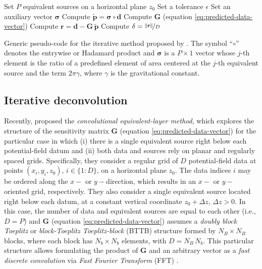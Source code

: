 \begin{algorithm}
	\Input{}
	Set $P$ equivalent sources on a horizontal plane $z_{0}$ \;
	Set a tolerance $\epsilon$ \;
	Set an auxiliary vector $\boldsymbol{\sigma}$ \;
	Compute $\tilde{\mathbf{p}} = \boldsymbol{\sigma} \circ \mathbf{d}$ \;
	Compute $\mathbf{G}$ (equation \ref{eq:predicted-data-vector}) \;
	Compute $\mathbf{r} = \mathbf{d} - \mathbf{G} \, \tilde{\mathbf{p}}$ \;
	Compute $\delta = \nicefrac{\| \mathbf{r} \|}{D}$ \;
	\caption{Generic pseudo-code for the iterative method proposed by \cite{siqueira-etal2017}.
	The symbol ``$\circ$'' denotes the entrywise or Hadamard product \cite[e.g.,][p. 298]{horn-johnson1991} and
	$\boldsymbol{\sigma}$ is a $P \times 1$ vector whose $j$-th element is the ratio of a predefined element of area centered at the $j$-th
	equivalent source and the term $2 \pi \gamma$, where $\gamma$ is the gravitational constant.}
	\label{alg:XS91-SOB17}
\end{algorithm}

\subsection{Iterative deconvolution}

Recently, \citet{takahashi-etal2020,takahashi-etal2022} proposed the \textit{convolutional equivalent-layer method}, 
which explores the structure of the sensitivity matrix $\mathbf{G}$ (equation \ref{eq:predicted-data-vector}) for 
the particular case in which (i) there is a single equivalent source right below each potential-field
datum and (ii) both data and sources rely on planar and regularly spaced grids.
Specifically, they consider a regular grid of $D$ 
potential-field data at points $(x_{i}, y_{i}, z_{0})$, $i \in \{1:D\}$, on a horizontal plane $z_{0}$.
The data indices $i$ may be ordered along the $x-$ or $y-$direction, which results in an
$x-$ or $y-$oriented grid, respectively.
They also consider a single equivalent source located right below each datum, at a constant vertical coordinate
$z_{0} + \Delta z$, $\Delta z > 0$.
In this case, the number of data and equivalent sources are equal to each other (i.e., $D = P$) and
$\mathbf{G}$ (equation \ref{eq:predicted-data-vector}) assumes a \textit{doubly block Toeplitz} \cite[][p. 28]{jain1989} or 
\textit{block-Toeplitz Toeplitz-block} (BTTB) \cite[][p. 67]{chan-jin2007} structure formed by $N_{B} \times N_{B}$
blocks, where each block has $N_{b} \times N_{b}$ elements, with $D = N_{B} \, N_{b}$.
This particular structure allows formulating the product
of $\mathbf{G}$ and an arbitrary vector as a \textit{fast discrete convolution} via 
\textit{Fast Fourier Transform} (FFT) \cite[][section 4.2]{vanloan1992}.

